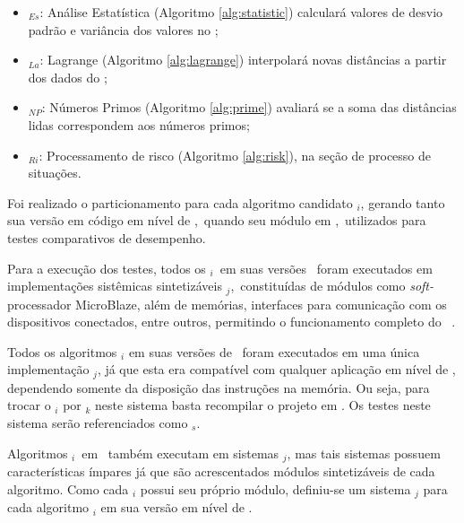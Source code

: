         \begin{itemize}
            \item \A$_{Es}$: Análise Estatística (Algoritmo \ref{alg:statistic}) calculará valores de desvio padrão e variância dos valores no \buffer;
            
            \item \A$_{La}$: Lagrange (Algoritmo \ref{alg:lagrange}) interpolará novas distâncias a partir dos dados do \buffer; 
            \item \A$_{NP}$: Números Primos (Algoritmo \ref{alg:prime}) avaliará se a soma das distâncias lidas correspondem aos números primos;
            \item \A$_{Ri}$: Processamento de risco (Algoritmo \ref{alg:risk}), na seção de processo de situações.
        \end{itemize}
    
    
        
        
        Foi realizado o particionamento para cada algoritmo candidato \A$_{i}$, gerando tanto sua versão em código em nível de \software,\ quando seu módulo em \hardware,\ utilizados para testes comparativos de desempenho.
        
        Para a execução dos testes, todos os \A$ _i $\ em suas versões \hs\ foram executados em implementações sistêmicas sintetizáveis \Ss$ _j $,\ constituídas de módulos como \textit{soft-}processador MicroBlaze, além de memórias, interfaces para comunicação com os dispositivos conectados, entre outros, permitindo o funcionamento completo do \wearable\ \cite{obeidat2011microblaze}.
        
        Todos os algoritmos \A$_{i}$ em suas versões de \software\ foram executados em uma única implementação \Ss$ _j $, já que esta era compatível com qualquer aplicação em nível de \software, dependendo somente da disposição das instruções na memória.
        Ou seja, para trocar o \A$_{i}$ por \A$_{k}$ neste sistema basta recompilar o projeto em \software.
        Os testes neste sistema serão referenciados como \Ss$ _{s} $.
        
        Algoritmos \A$ _i $\ em \hardware\ também executam em sistemas \Ss$ _j $, mas tais sistemas possuem características ímpares já que são acrescentados módulos sintetizáveis de cada algoritmo.
        Como cada \A$_i$ possui seu próprio módulo, definiu-se um sistema \Ss$_j$ para cada algoritmo \A$_{i}$ em sua versão em nível de \hardware.
        
